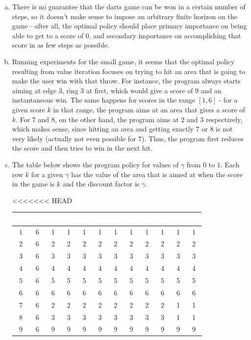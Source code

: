 \documentclass{article}
\begin{document}
\begin{enumerate}
\begin{enumerate}[(a)]
                \item There is no guarantee that the darts game can be won in a certain number of steps, so it doesn't make sense to impose an arbitrary finite horizon on the game---after all, the optimal policy should place primary importance on being able to get to a score of 0, and secondary importance on accomplishing that score in as few steps as possible.
                \item Running experiments for the small game, it seems that the optimal policy resulting from value iteration focuses on trying to hit an area that is going to make the user win with that throw. For instance, the program always starts aiming at edge $3$, ring $3$ at first, which would give a score of $9$ and an instantaneous win. The same happens for scores in the range $[1,6]$ - for a given score $k$ in that range, the program aims at an area that gives a score of $k$. For $7$ and $8$, on the other hand, the program aims at $2$ and $3$ respectively, which makes sense, since hitting an area and getting exactly $7$ or $8$ is not very likely (actually not even possible for $7$). Thus, the program first reduces the score and then tries to win in the next hit.
                
                \item The table below shows the program policy for values of $\gamma$ from $0$ to $1$. Each row $k$ for a given $\gamma$ has the value of the area that is aimed at when the score in the game is $k$ and the discount factor is $\gamma$.
                
<<<<<<< HEAD
\begin{center} \begin{tabular}[h]{|c|c|c|c|c|c|c|c|c|c|c|c|} \hline
\rowcolor{black}
\textcolor{white}{$\gamma/k$} & \textcolor{white}{$0.0$} & \textcolor{white}{$0.1$} &   \textcolor{white}{$0.2$} &  \textcolor{white}{$0.3$} &  \textcolor{white}{$0.4$} &  \textcolor{white}{$0.5$} &  \textcolor{white}{$0.6$} &  \textcolor{white}{$0.7$} &  \textcolor{white}{$0.8$} &  \textcolor{white}{$0.9$} &  \textcolor{white}{$1.0$}\\ \hline
$1$ & 6 & 1 & 1 & 1 & 1 & 1 & 1 & 1 & 1 & 1 & 1 \\
$2$ & 6 & 2 & 2 & 2 & 2 & 2 & 2 & 2 & 2 & 2 & 2 \\
$3$ & 6 & 3 & 3 & 3 & 3 & 3 & 3 & 3 & 3 & 3 & 3 \\
$4$ & 6 & 4 & 4 & 4 & 4 & 4 & 4 & 4 & 4 & 4 & 4 \\
$5$ & 6 & 5 & 5 & 5 & 5 & 5 & 5 & 5 & 5 & 5 & 5 \\
$6$ & 6 & 6 & 6 & 6 & 6 & 6 & 6 & 6 & 6 & 6 & 6 \\
$7$ & 6 & 2 & 2 & 2 & 2 & 2 & 2 & 2 & 2 & 1 & 1 \\
$8$ & 6 & 3 & 3 & 3 & 3 & 3 & 3 & 3 & 3 & 1 & 1 \\
$9$ & 6 & 9 & 9 & 9 & 9 & 9 & 9 & 9 & 9 & 9 & 9 \\ \hline
\end{tabular} \end{center}


\end{enumerate}
\end{enumerate}
\end{document}
